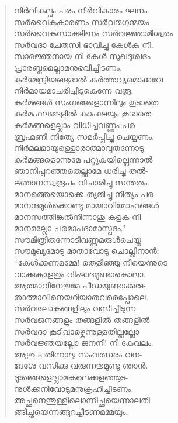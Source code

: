 \begin{verse}
നിര്‍വികല്പം പരം നിര്‍വികാരം ഘനം\\
സര്‍വൈകകാരണം സര്‍വജഗന്മയം\\
സര്‍വൈകസാക്ഷിണം സര്‍വജ്ഞാമീശ്വരം\\
സര്‍വദാ ചേതസി ഭാവിച്ചു കേള്‍ക നീ.\\
സാരജ്ഞനായ നീ കേള്‍ സുഖദുഃഖദം\\
പ്രാരബ്ധമെല്ലാമനുഭവിച്ചീടണം.\\
കര്‍മേന്ദ്രിയങ്ങളാല്‍ കര്‍ത്തവ്യമൊക്കവേ\\
നിര്‍മായമാചരിച്ചീടുകെന്നേ വരൂ.\\
കര്‍മങ്ങള്‍ സംഗങ്ങളൊന്നിലും കൂടാതെ\\
കര്‍മഫലങ്ങളില്‍ കാംക്ഷയും കൂടാതെ\\
കര്‍മങ്ങളെല്ലാം വിധിച്ചവണ്ണം പര-\\
ബ്രഹ്മണി നിത്യേ സമര്‍പ്പിച്ചു ചെയ്യണം.\\
നിര്‍മലമായുള്ളൊരാത്മാവുതന്നോടു\\
കര്‍മങ്ങളൊന്നുമേ പറ്റുകയില്ലെന്നാല്‍\\
ഞാനിപ്പറഞ്ഞതെല്ലാമേ ധരിച്ചു തല്‍-\\
ജ്ഞാനസ്വരൂപം വിചാരിച്ചു സന്തതം\\
മാനത്തെയൊക്കെ ത്യജിച്ചു നിത്യം പര-\\
മാനന്ദമുള്‍ക്കൊണ്ടു മായാവിമോഹങ്ങള്‍\\
മാനസത്തിങ്കല്‍നിന്നാശു കളക നീ\\
മാനമല്ലോ പരമാപദാമാസ്പദം.”\\
സൗമിത്രിതന്നോടിവണ്ണമരുള്‍ചെയ്തു\\
സൗമുഖ്യമോടു മാതാവോടു ചൊല്ലിനാന്‍:\\
“കേള്‍ക്കണമമ്മേ! തെളിഞ്ഞു നീയെന്നുടെ\\
വാക്കുകളേതും വിഷാദമുണ്ടാകൊലാ.\\
ആത്മാവിനേതുമേ പീഡയുണ്ടാക്കരു-\\
താത്മാവിനെയറിയാതവരെപ്പോലെ.\\
സര്‍വലോകങ്ങളിലും വസിച്ചീടുന്ന\\
സര്‍വജനങ്ങളും തങ്ങളില്‍ തങ്ങളില്‍\\
സര്‍വദാ കൂടിവാഴ്കെന്നുള്ളതില്ലല്ലോ\\
സര്‍വജ്ഞയല്ലോ ജനനി! നീ കേവലം.\\
ആശു പതിന്നാലു സംവത്സരം വന-\\
ദേശേ വസിക്കു വരുന്നതുമുണ്ടു ഞാന്‍.\\
ദുഃഖങ്ങളെല്ലാമകലെക്കളഞ്ഞുട-\\
നുള്‍ക്കനിവോടുമനുക്രഹിച്ചീടണം.\\
അച്ഛനെന്തുള്ളിലൊന്നിച്ഛയെന്നാലതി-\\
ങ്ങിച്ഛയെന്നങ്ങുറച്ചീടണമമ്മയും.\\

\end{verse}

